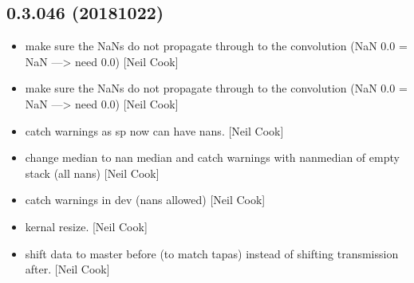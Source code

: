 \documentclass[a4paper,10pt,english]{report}
\begin{document}
\subsection{0.3.046 (2018\sphinxhyphen{}10\sphinxhyphen{}22)}
\label{\detokenize{misc/changelog:id305}}\begin{itemize}
\item {} 
 \sphinxhyphen{} make sure the NaNs do not propagate through to the
convolution (NaN \sphinxtitleref{*} 0.0 = NaN —\textgreater{} need 0.0) {[}Neil Cook{]}

\item {} 
 \sphinxhyphen{} make sure the NaNs do not propagate through to the
convolution (NaN \sphinxtitleref{*} 0.0 = NaN —\textgreater{} need 0.0) {[}Neil Cook{]}

\item {} 
 \sphinxhyphen{} catch warnings as sp now can have nans. {[}Neil Cook{]}

\item {} 
 \sphinxhyphen{} change median to nan median and catch
warnings with nanmedian of empty stack (all nans) {[}Neil Cook{]}

\item {} 
 \sphinxhyphen{} catch warnings in dev (nans allowed) {[}Neil Cook{]}

\item {} 
 \sphinxhyphen{} kernal resize. {[}Neil Cook{]}

\item {} 
 \sphinxhyphen{} shift data to master before (to match tapas) \sphinxhyphen{}
instead of shifting transmission after. {[}Neil Cook{]}

\end{itemize}
\end{document}
